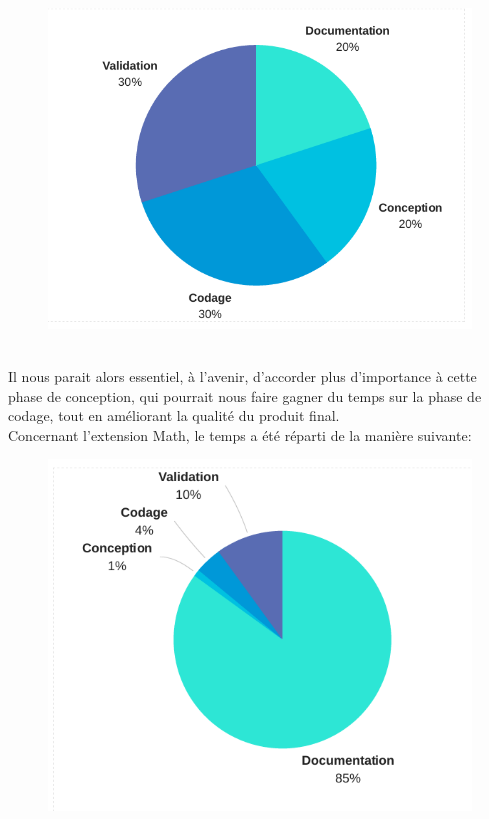 \documentclass{article}
\begin{document}
\begin{figure}[ht]
\centering
      \includegraphics[scale=0.30]{coucou.png}
\end{figure}
\\
Il nous parait alors essentiel, à l'avenir, d'accorder plus d'importance à cette phase de conception, qui pourrait nous faire gagner
du temps sur la phase de codage, tout en améliorant la qualité du produit final.
\\
Concernant l'extension Math, le temps a été réparti de la manière suivante:
\begin{figure}[ht]
\centering
      \includegraphics[scale=0.34]{theo.png}
\end{figure}
\end{document}
